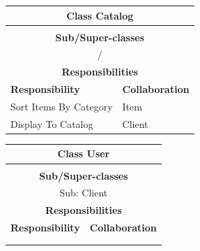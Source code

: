 \documentclass[•]{article}
\begin{document}
\begin{table}
\begin{tabular}{|l||l|}
\hline
\multicolumn{2}{|c|}{ Class \textbf{Catalog} }\\ \hline
\multicolumn{2}{|c|}{}\\ \hline
\multicolumn{2}{|c|}{ \textbf{Sub/Super-classes} }\\ \hline
\multicolumn{2}{|c|}{/} \\ \hline
\multicolumn{2}{|c|}{ \textbf{Responsibilities}}\\ \hline
\textbf{Responsibility} & \textbf{Collaboration} \\ \hline
Sort Items By Category & Item \\ \hline
Display To Catalog & Client \\ \hline
\end{tabular}
\begin{tabular}{|l||l|}
\hline
\multicolumn{2}{|c|}{ Class \textbf{User} }\\ \hline
\multicolumn{2}{|c|}{}\\ \hline
\multicolumn{2}{|c|}{ \textbf{Sub/Super-classes} }\\ \hline
\multicolumn{2}{|c|}{Sub: Client} \\ \hline
\multicolumn{2}{|c|}{ \textbf{Responsibilities}}\\ \hline
\textbf{Responsibility} & \textbf{Collaboration} \\ \hline
 &  \\ 
 &  \\
 \hline
\end{tabular}


\end{table}
\end{document}
